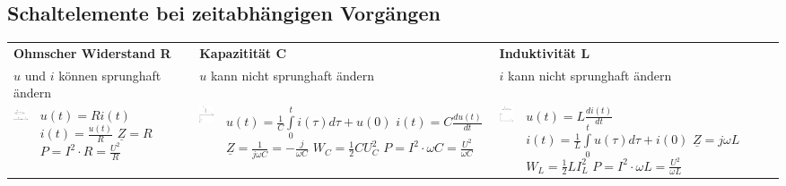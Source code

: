 	\subsection{Schaltelemente bei zeitabhängigen Vorgängen}
	\begin{tabular}{p{1.5cm} p{4.3cm} p{1.5cm} p{4.3cm} p{1.5cm} p{4.3cm}}
   		\multicolumn{2}{l}{\textbf{Ohmscher Widerstand R}}
   			& \multicolumn{2}{l}{\textbf{Kapazitität C}}
   			& \multicolumn{2}{l}{\textbf{Induktivität L}} \\
   		\multicolumn{2}{l}{$u$ und $i$ können sprunghaft ändern}
   			& \multicolumn{2}{l}{$u$ kann nicht sprunghaft ändern}
   			& \multicolumn{2}{l}{$i$ kann nicht sprunghaft ändern} \\
   		\parbox{1.5cm}{
			\includegraphics[width=1.5cm]{./images/zeigerdiag-r.png}}
			& \parbox{4.3cm}{$u(t) = R i(t)$ \\
				$i(t) = \frac{u(t)}{R}$ \\
				$\underline{Z} = R$ \\
				$P=I^2 \cdot R = \frac{U^2}{R}$}
   			& \parbox{1.5cm}{
				\includegraphics[width=1.5cm]{./images/zeigerdiag-c.png}}
			& \parbox{4.3cm}{
				$u(t) = \frac1C \int\limits_0^t i(\tau) d\tau + u(0)$ \\
				$i(t) = C \frac{d u(t)}{dt}$ \\
				$\underline{Z} = \frac{1}{j \omega C} = - \frac{j}{\omega C}$ \\
				$W_C=\frac12 C U_C^2$\\
				$P= I^2 \cdot \omega C = \frac{U^2}{\omega C}$}
   			& \parbox{1.5cm}{
				\includegraphics[width=1.5cm]{./images/zeigerdiag-l.png}}
			& \parbox{4.3cm}{
				$u(t) = L \frac{di(t)}{dt}$ \\
				$i(t) = \frac1L \int\limits_0^t u(\tau) d\tau + i(0)$ \\
				$\underline{Z} = j \omega L$ \\
				$W_L=\frac12 L I_L^2$\\
				$P= I^2 \cdot \omega L = \frac{U^2}{\omega L}$}
   	\end{tabular}

